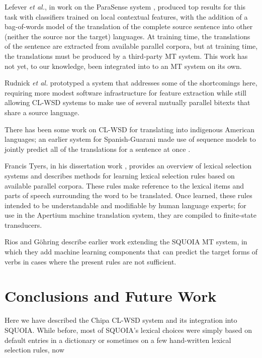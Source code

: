 \documentclass[10pt, a4paper]{article}
\begin{document}
Lefever \emph{et al.}, in work on the ParaSense system
, produced top results for
this task with classifiers trained on local contextual features, with the 
addition of a bag-of-words model of the translation of the complete source
sentence into other (neither the source nor the target) languages. At training
time, the translations of the sentence are extracted from available parallel
corpora, but at training time, the translations must be produced by a
third-party MT system.
This work has not yet, to our knowledge, been integrated into to an MT system
on its own.

Rudnick \emph{et al.} 
prototyped a system that addresses some of the shortcomings here, requiring
more modest software infrastructure for feature extraction while still allowing
CL-WSD systems to make use of several mutually parallel bitexts that share a
source language.

There has been some work on CL-WSD for translating into indigenous American
languages; an earlier system for Spanish-Guarani made use of sequence models to
jointly predict all of the translations for a sentence at once
\cite{rudnick-gasser:2013:HyTra}.

Francis Tyers, in his dissertation work \cite{tyers-dissertation}, provides an
overview of lexical selection systems and describes methods for learning
lexical selection rules based on available parallel corpora. These rules make
reference to the lexical items and parts of speech surrounding the word to be
translated. Once learned, these rules intended to be understandable and
modifiable by human language experts; for use in the Apertium machine
translation system, they are compiled to finite-state transducers.

Rios and G\"{o}hring  describe
earlier work extending the SQUOIA MT system, in which they add machine learning
components that can predict the target forms of verbs in cases where the
present rules are not sufficient.

\section{Conclusions and Future Work}
Here we have described the Chipa CL-WSD system and its integration into SQUOIA.
While before, most of SQUOIA's lexical choices were simply based on default
entries in a dictionary or sometimes on a few hand-written lexical selection
rules, now 




\end{document}
